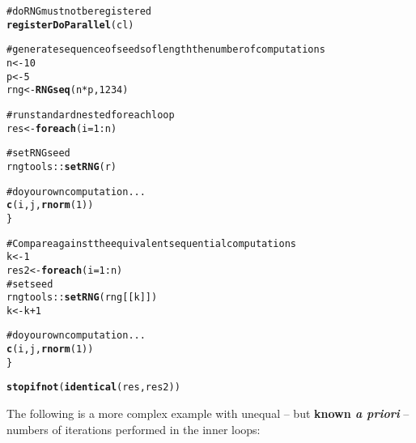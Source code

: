 \documentclass[a4paper,12pt]{article}\usepackage{graphicx, color}
\makeatletter
\newcommand{\hlfunctioncall}[1]{\textcolor[rgb]{0.501960784313725,0,0.329411764705882}{\textbf{#1}}}%
\newcommand{\hlcomment}[1]{\textcolor[rgb]{0.180392156862745,0.6,0.341176470588235}{#1}}%
\newenvironment{kframe}{%
 \def\at@end@of@kframe{}%
 \ifinner\ifhmode%
  \def\at@end@of@kframe{\end{minipage}}%
  \begin{minipage}{\columnwidth}%
 \fi\fi%
 \def\FrameCommand##1{\hskip\@totalleftmargin \hskip-\fboxsep
 \colorbox{shadecolor}{##1}\hskip-\fboxsep
     \hskip-\linewidth \hskip-\@totalleftmargin \hskip\columnwidth}%
 \MakeFramed {\advance\hsize-\width
   \@totalleftmargin\z@ \linewidth\hsize
   \@setminipage}}%
 {\par\unskip\endMakeFramed%
 \at@end@of@kframe}
\newenvironment{knitrout}{}{} %
\renewenvironment{knitrout}{\begin{footnotesize}}{\end{footnotesize}}
\makeatother
\begin{document}
\begin{knitrout}
\color{fgcolor}\begin{kframe}
\begin{alltt}

\hlcomment{# doRNG must not be registered}
\hlfunctioncall{registerDoParallel}(cl)

\hlcomment{# generate sequence of seeds of length the number of computations}
n <- 10
p <- 5
rng <- \hlfunctioncall{RNGseq}(n * p, 1234)

\hlcomment{# run standard nested foreach loop}
res <- \hlfunctioncall{foreach}(i = 1:n) %:% \hlfunctioncall{foreach}(j = 1:p, r = rng[(i - 1) * p + 1:p]) %dopar% \{
    
\hlcomment{    # set RNG seed}
    rngtools::\hlfunctioncall{setRNG}(r)
    
\hlcomment{    # do your own computation ...}
    \hlfunctioncall{c}(i, j, \hlfunctioncall{rnorm}(1))
\}

\hlcomment{# Compare against the equivalent sequential computations}
k <- 1
res2 <- \hlfunctioncall{foreach}(i = 1:n) %:% \hlfunctioncall{foreach}(j = 1:p) %do% \{
\hlcomment{    # set seed}
    rngtools::\hlfunctioncall{setRNG}(rng[[k]])
    k <- k + 1
    
\hlcomment{    # do your own computation ...}
    \hlfunctioncall{c}(i, j, \hlfunctioncall{rnorm}(1))
\}

\hlfunctioncall{stopifnot}(\hlfunctioncall{identical}(res, res2))
\end{alltt}
\end{kframe}
\end{knitrout}


The following is a more complex example with unequal -- but \textbf{known \emph{a priori}} -- 
numbers of iterations performed in the inner loops:
\end{document}
